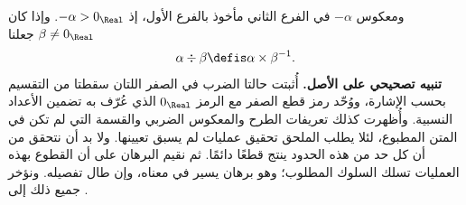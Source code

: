 \documentclass[../../../include/open-logic-section]{subfiles}
\begin{document}
ومعكوس $\mathord{-}\alpha$ في الفرع الثاني مأخوذ بالفرع الأول، إذ
$\mathord{-}\alpha>0_\Real$. وإذا كان $\beta\neq0_\Real$ جعلنا
\[
	\alpha \div \beta \defis \alpha \times \beta^{-1}.
\]
\textbf{تنبيه تصحيحي على الأصل.} أُثبتت حالتا الضرب في الصفر اللتان
سقطتا من التقسيم بحسب الإشارة، ووُحّد رمز قطع الصفر مع الرمز $0_\Real$
الذي عُرّف به تضمين الأعداد النسبية. وأُظهرت كذلك تعريفات الطرح والمعكوس
الضربي والقسمة التي لم تكن في المتن المطبوع، لئلا يطلب الملحق تحقيق
عمليات لم يسبق تعيينها.
ولا بد أن نتحقق من أن كل حد من هذه الحدود ينتج قطعًا دائمًا. ثم نقيم البرهان على أن القطوع بهذه العمليات تسلك السلوك المطلوب؛ وهو برهان يسير في معناه، وإن طال تفصيله. ونؤخر جميع ذلك إلى .
\end{document}
